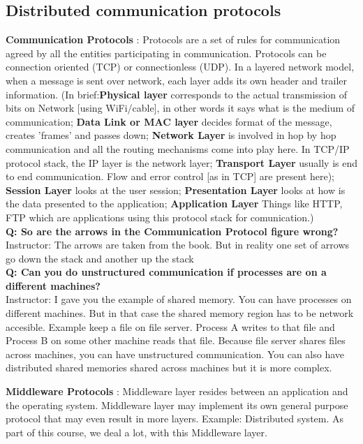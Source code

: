 \documentclass[twoside]{article}
\begin{document}
\subsection{Distributed communication protocols}
\begin{description}
\item{ \textbf{Communication Protocols}} : Protocols are a set of rules for communication agreed by all the entities participating in communication. Protocols can be connection oriented (TCP) or connectionless (UDP). In a layered network model, when a message is sent over network, each layer adds its own header and trailer information. (In brief:\textbf{Physical layer} corresponds to the actual transmission of bits on Network [using WiFi/cable], in other words it says what is the medium of communication; \textbf{Data Link or MAC layer} decides format of the message, creates 'frames' and passes down; \textbf{Network Layer} is involved in hop by hop communication and all the routing mechanisms come into play here. In TCP/IP protocol stack, the IP layer is the network layer; \textbf{Transport Layer} usually is end to end communication. Flow and error control [as in TCP] are present here); \textbf{Session Layer} looks at the user session; \textbf{Presentation Layer} looks at how is the data presented to the application; \textbf{Application Layer} Things like HTTP, FTP which are applications using this protocol stack for comunication.)
\\\textbf{Q: So are the arrows in the Communication Protocol figure wrong?}\\
{Instructor: The arrows are taken from the book. But in reality one set of arrows go down the stack and another up the stack}
\\\textbf{Q: Can you do unstructured communication if processes are on a different machines?}\\
{Instructor: I gave you the example of shared memory. You can have processes on different machines. But in that case the shared memory region has to be network accesible. Example keep a file on file server. Process A writes to that file and Process B on some other machine reads that file. Because file server shares files across machines, you can have unstructured communication. You can also have distributed shared memories shared across machines but it is more complex.}
\item{ \textbf{Middleware Protocols}} : Middleware layer resides between an application and the operating system. Middleware layer may implement its own general purpose protocol that may even result in more layers. Example: Distributed system. As part of this course, we deal a lot, with this Middleware layer.

\end{description}
\end{document}

